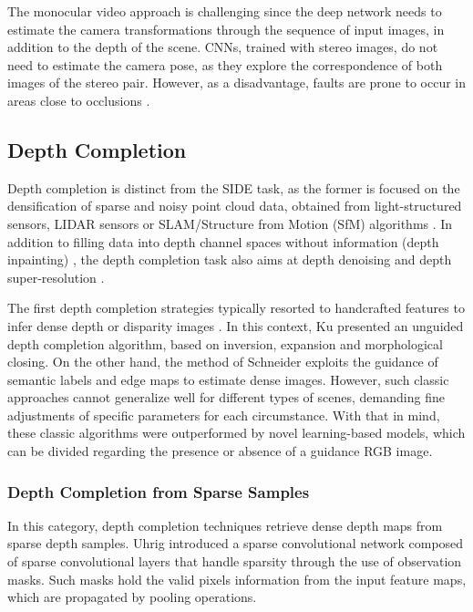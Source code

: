 \documentclass[5p]{elsarticle}
\begin{document}
The monocular video approach is challenging since the deep network needs to estimate the camera transformations through the sequence of input images, in addition to the depth of the scene. CNNs, trained with stereo images, do not need to estimate the camera pose, as they explore the correspondence of both images of the stereo pair. However, as a disadvantage, faults are prone to occur in areas close to occlusions \cite{godard2019digging}.

\subsection{Depth Completion}

Depth completion is distinct from the SIDE task, as the former is focused on the densification of sparse and noisy point cloud data, obtained from light-structured sensors, LIDAR sensors or SLAM/Structure from Motion (SfM) algorithms \cite{cheng2019cspn++}. In addition to filling data into depth channel spaces without information (depth inpainting) \cite{herrera2013depth, zhang2018probability}, the depth completion task also aims at depth denoising \cite{zhang2016fast, shen2013layer} and depth super-resolution \cite{yu2013shading, lu2015sparse}.

The first depth completion strategies typically resorted to handcrafted features to infer dense depth or disparity images \cite{qiu2019deeplidar}. In this context, Ku \etal \cite{ku2018defense} presented an unguided depth completion algorithm, based on inversion, expansion and morphological closing. On the other hand, the method of Schneider \etal \cite{schneider2016semantically} exploits the guidance of semantic labels and edge maps to estimate dense images. However, such classic approaches cannot generalize well for different types of scenes, demanding fine adjustments of specific parameters for each circumstance. With that in mind, these classic algorithms were outperformed by novel learning-based models, which can be divided regarding the presence or absence of a guidance RGB image.

\subsubsection{Depth Completion from Sparse Samples}

In this category, depth completion techniques retrieve dense depth maps from sparse depth samples. Uhrig \etal \cite{uhrig2017sparsity} introduced a sparse convolutional network composed of sparse convolutional layers that handle sparsity through the use of observation masks. Such masks hold the valid pixels information from the input feature maps, which are propagated by pooling operations.
\end{document}
